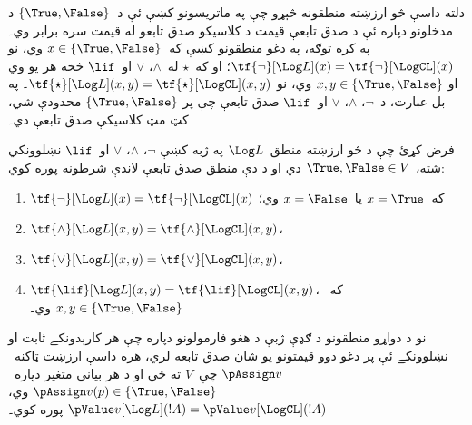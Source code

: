 \documentclass[../../../include/open-logic-section]{subfiles}
\begin{document}


دلته داسې څو ارزښته منطقونه څېړو چې په ماتريسونو کښې ئې د~$\{\True, \False\}$ د مدخلونو دپاره ئې د صدق
تابعې قيمت د کلاسيکو صدق تابعو له قيمت سره برابر وي۔ په کره توګه،
په دغو منطقونو کښې که~$x \in \{\True, \False\}$ وي، نو
$\tf{\lnot}[\Log L](x) = \tf{\lnot}[\LogCL](x)$؛ او که~$\star$
له~$\land$، $\lor$ او~$\lif$ څخه هر يو وي او
$x, y \in \{\True, \False\}$ وي، نو
$\tf{\star}[\Log L](x,y) = \tf{\star}[\LogCL](x,y)$۔ په بل عبارت،
د~$\lnot$، $\land$، $\lor$ او~$\lif$ صدق تابعې چې پر
$\{\True,\False\}$ محدودې شي، کټ مټ کلاسيکې صدق تابعې دي۔

\begin{prop}
  فرض کړئ چې د څو ارزښته منطق~$\Log L$ په ژبه کښې
  $\lnot$، $\land$، $\lor$ او~$\lif$ نښلوونکي شته،
  $\True, \False \in V$ دي او د دې منطق صدق تابعې
  لاندې شرطونه پوره کوي:
  \begin{enumerate}
    \item{} $\tf{\lnot}[\Log L](x) = \tf{\lnot}[\LogCL](x)$ که~$x =
    \True$ يا~$x = \False$ وي؛
    \item{} $\tf{\land}[\Log L](x,y) = \tf{\land}[\LogCL](x,y)$،
    \item{} $\tf{\lor}[\Log L](x,y) = \tf{\lor}[\LogCL](x,y)$،
    \item{} $\tf{\lif}[\Log L](x,y) = \tf{\lif}[\LogCL](x,y)$،
    که~$x, y \in \{\True, \False\}$ وي۔
  \end{enumerate}
  نو د دواړو منطقونو د ګډې ژبې د هغو فارمولونو دپاره چې هر
  کارېدونکے ثابت او نښلوونکے ئې پر دغو دوو قيمتونو يو شان صدق
  تابعه لري، هره داسې ارزښت ټاکنه~$\pAssign v$ چې~$V$ ته ځي او د هر
  بياني متغير دپاره~$\pAssign v(p) \in \{\True,\False\}$ وي،
  $\pValue v[\Log L](!A) = \pValue v[\LogCL](!A)$ پوره کوي۔
\end{prop}
\end{document}
